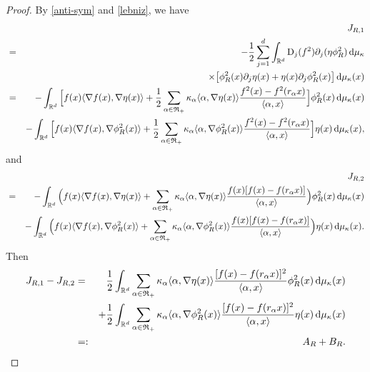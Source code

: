 \documentclass[11pt,a4paper]{article}
\def\R{\mathbb{R}}
\def\D{\mathbb{D}}
\def\d{\textup{d}}
\def\D{\textup{D}}
\theoremstyle{definition}\newtheorem{remark}[theorem]{Remark}
\begin{document}
\begin{proof}
 By \eqref{anti-sym} and \eqref{lebniz}, we have
\begin{eqnarray*}
&&J_{R,1}\\
&=&-\frac{1}{2}\sum_{j=1}^d\int_{\R^d}\D_j(f^2)\partial_j(\eta\phi_R^2)\,\d\mu_\kappa\\
&&\times\big[\phi_R^2(x)\partial_j\eta(x)+\eta(x)\partial_j\phi_R^2(x)\big]\,\d\mu_\kappa(x)\\
&=&-\int_{\R^d}\Big[f(x)\langle \nabla f(x),\nabla\eta(x)\rangle+\frac{1}{2}\sum_{\alpha\in\mathfrak{R}_+}\kappa_\alpha\langle\alpha,\nabla\eta(x)\rangle\frac{f^2(x)-f^2(r_\alpha x)}{\langle\alpha,x\rangle}\Big]\phi_R^2(x)\,\d\mu_\kappa(x)\\
&&-\int_{\R^d}\Big[f(x)\langle \nabla f(x),\nabla\phi_R^2(x)\rangle+\frac{1}{2}\sum_{\alpha\in\mathfrak{R}_+}\kappa_\alpha\langle\alpha,\nabla\phi_R^2(x)\rangle\frac{f^2(x)-f^2(r_\alpha x)}{\langle\alpha,x\rangle}\Big]\eta(x)\,\d\mu_\kappa(x),
\end{eqnarray*}
and
\begin{eqnarray*}
&&J_{R,2}\\
&=&-\int_{\R^d}\Big(f(x)\langle \nabla f(x),\nabla\eta(x)\rangle+\sum_{\alpha\in\mathfrak{R}_+}\kappa_\alpha\langle\alpha,\nabla\eta(x)\rangle\frac{f(x)[f(x)-f(r_\alpha x)]}{\langle\alpha,x\rangle}\Big)\phi_R^2(x)\,\d\mu_\kappa(x)\\
&&-\int_{\R^d}\Big(f(x)\langle \nabla f(x),\nabla\phi_R^2(x)\rangle+\sum_{\alpha\in\mathfrak{R}_+}\kappa_\alpha\langle\alpha,\nabla\phi_R^2(x)\rangle\frac{f(x)[f(x)-f(r_\alpha x)]}{\langle\alpha,x\rangle}\Big)\eta(x)\,\d\mu_\kappa(x).
\end{eqnarray*}
Then
\begin{eqnarray}\label{J1-J2}
J_{R,1}-J_{R,2}&=&\frac{1}{2}\int_{\R^d}\sum_{\alpha\in\mathfrak{R}_+}\kappa_\alpha\langle\alpha,\nabla\eta(x)\rangle\frac{[f(x)-f(r_\alpha x)]^2}{\langle \alpha,x\rangle}\phi_R^2(x)\,\d\mu_\kappa(x)\cr
&&+\frac{1}{2}\int_{\R^d}\sum_{\alpha\in\mathfrak{R}_+}\kappa_\alpha\langle\alpha,\nabla\phi_R^2(x)\rangle\frac{[f(x)-f(r_\alpha x)]^2}{\langle \alpha,x\rangle}\eta(x)\,\d\mu_\kappa(x)\cr
&=:&A_R+B_R.
\end{eqnarray}


\end{proof}
\end{document}
